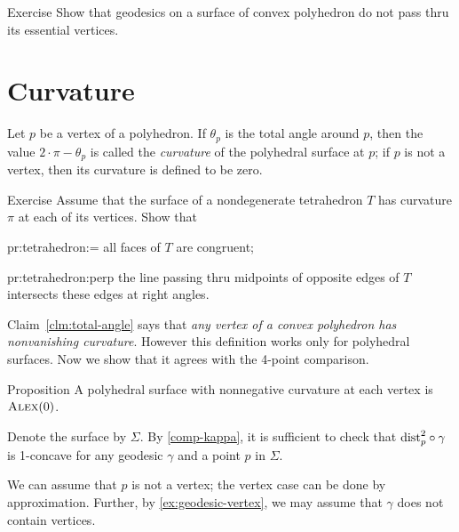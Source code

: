 \begin{thm}{Exercise}\label{ex:geodesic-vertex}
Show that geodesics on a surface of convex polyhedron do not pass thru its essential vertices.
\end{thm}

\section{Curvature}

Let $p$ be a vertex of a polyhedron.
If $\theta_p$ is the total angle around $p$, then the value $2\cdot \pi -\theta_p$ is called the \emph{curvature} of the polyhedral surface at $p$;
if $p$ is not a vertex, then its curvature is defined to be zero.

\begin{thm}{Exercise}\label{pr:tetrahedron} 
Assume that the surface of a nondegenerate tetrahedron $T$ has curvature $\pi$ at each of its vertices.
Show that 

\begin{subthm}{pr:tetrahedron:=}
all faces of $T$ are congruent; 
\end{subthm}

\begin{subthm}{pr:tetrahedron:perp} the line passing thru midpoints of opposite edges of $T$ intersects these edges at right angles.
\end{subthm}
 
\end{thm}

Claim~\ref{clm:total-angle} says that \textit{any vertex of a convex polyhedron has nonvanishing curvature}.
However this definition works only for polyhedral surfaces.
Now we show that it agrees with the 4-point comparison.

\begin{thm}{Proposition}\label{prop:poly-CBB}
A polyhedral surface with nonnegative curvature at each vertex is $\textsc{Alex}(0)$.
\end{thm}

Denote the surface by $\Sigma$.
By \ref{comp-kappa}, it is sufficient to check that 
$\mathrm{dist}_p^2\circ\gamma$ is 1-concave for any geodesic $\gamma$ and a point $p$ in $\Sigma$.

We can assume that $p$ is not a vertex;
the vertex case can be done by approximation.
Further, by \ref{ex:geodesic-vertex}, we may assume that $\gamma$ does not contain vertices.

